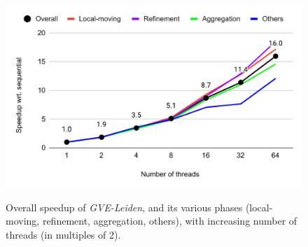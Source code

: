 \begin{figure}[hbtp]
  \centering
  \includegraphics[width=0.98\linewidth]{out/leiden-ss.pdf} \\[-2ex]
  \caption{Overall speedup of \textit{GVE-Leiden}, and its various phases (local-moving, refinement, aggregation, others), with increasing number of threads (in multiples of 2).}
  \label{fig:leiden-ss}
\end{figure}
